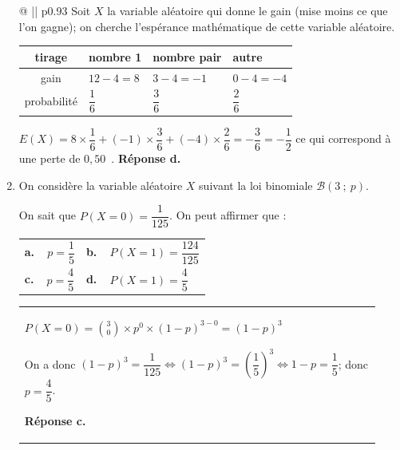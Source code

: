 \documentclass[10pt]{article}
\providecommand{\euro}{\texteuro}
\providecommand{\euro}{{\text{€}}}
\providecommand{\ds}{\displaystyle}
\renewcommand{\euro}{\ifmmode\text{\texteuro}\else\texteuro\fi}
\begin{document}
\begin{enumerate}
\medskip

\begin{tabular}{@{\hspace*{0.05\linewidth}} || p{0.93\linewidth}}
Soit $X$ la variable aléatoire qui donne le gain (mise moins ce que l'on gagne); on cherche l'espérance mathématique de cette variable aléatoire.

\begin{center}
\begin{tabularx}{0.9\linewidth}{|c|*{3}{>{\centering \arraybackslash}X|}}
\hline
tirage & nombre 1 & nombre pair & autre\\
\hline
gain &	 $12-4=8$ & $3-4=-1$ & $0-4=-4$\\
\hline
probabilité & $\dfrac{1}{6}$ & $\dfrac{3}{6}$ & $\dfrac{2}{6}$\rule[-12pt]{0pt}{30pt}\\
\hline
\end{tabularx}
\end{center}

$E(X)= 8\times \dfrac{1}{6} +(-1)\times \dfrac{3}{6} + (-4)\times \dfrac{2}{6}
= -\dfrac{3}{6}=-\dfrac{1}{2}$ ce qui correspond à une perte de $0,50$~\euro.
\hfill\textbf{Réponse d.}
\end{tabular}

\medskip

\item On considère la variable aléatoire $X$ suivant la loi binomiale $\mathcal{B}(3~;~p)$.

On sait que $P(X = 0) = \dfrac{1}{125}$. On peut affirmer que :

\begin{center}
\renewcommand\arraystretch{1.9}
\begin{tabularx}{\linewidth}{*{2}{X}}
\textbf{a.~~}$p = \dfrac{1}{5}$&\textbf{b.~~}$P(X = 1) =\dfrac{124}{125}$\\
\textbf{c.~~}$p = \dfrac{4}{5}$&\textbf{d.~~}$P(X= 1) =\dfrac{4}{5}$
\end{tabularx}
\end{center}

\medskip

\begin{tabular}{@{\hspace*{0.05\linewidth}} || p{0.93\linewidth}}
$P(X=0) = \ds\binom{3}{0}\times p^0 \times (1-p)^{3-0} =  (1-p)^3$

On a donc $(1-p)^3 = \dfrac{1}{125} \iff (1-p)^3 = \left ( \dfrac{1}{5}\right )^3 \iff 1-p=\dfrac{1}{5}$; donc $p=\dfrac{4}{5}$.

\hfill\textbf{Réponse c.}
\end{tabular}
\end{enumerate}
\end{document}
